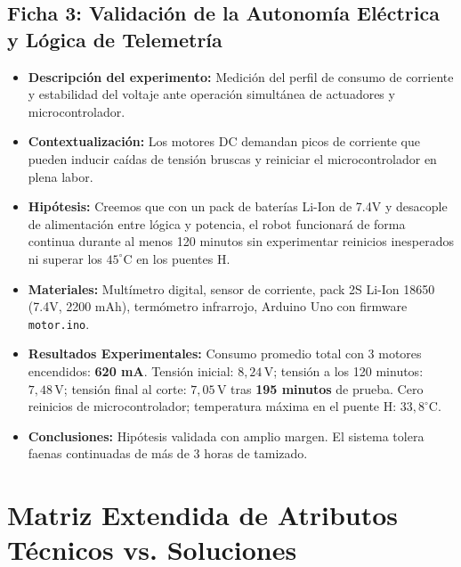 \documentclass[12pt,letterpaper]{article}
\begin{document}
\subsection{Ficha 3: Validación de la Autonomía Eléctrica y Lógica de Telemetría}
\begin{itemize}[leftmargin=*, noitemsep]
    \item \textbf{Descripción del experimento:} Medición del perfil de consumo de corriente y estabilidad del voltaje ante operación simultánea de actuadores y microcontrolador.
    \item \textbf{Contextualización:} Los motores DC demandan picos de corriente que pueden inducir caídas de tensión bruscas y reiniciar el microcontrolador en plena labor.
    \item \textbf{Hipótesis:} Creemos que con un pack de baterías Li-Ion de 7.4V y desacople de alimentación entre lógica y potencia, el robot funcionará de forma continua durante al menos 120 minutos sin experimentar reinicios inesperados ni superar los $45^\circ\text{C}$ en los puentes H.
    \item \textbf{Materiales:} Multímetro digital, sensor de corriente, pack 2S Li-Ion 18650 (7.4V, 2200 mAh), termómetro infrarrojo, Arduino Uno con firmware \texttt{motor.ino}.
    \item \textbf{Resultados Experimentales:} Consumo promedio total con 3 motores encendidos: \textbf{620 mA}. Tensión inicial: $8,24\,\text{V}$; tensión a los 120 minutos: $7,48\,\text{V}$; tensión final al corte: $7,05\,\text{V}$ tras \textbf{195 minutos} de prueba. Cero reinicios de microcontrolador; temperatura máxima en el puente H: $33,8^\circ\text{C}$.
    \item \textbf{Conclusiones:} Hipótesis validada con amplio margen. El sistema tolera faenas continuadas de más de 3 horas de tamizado.
\end{itemize}

\clearpage

\section{Matriz Extendida de Atributos Técnicos vs. Soluciones}
\end{document}
